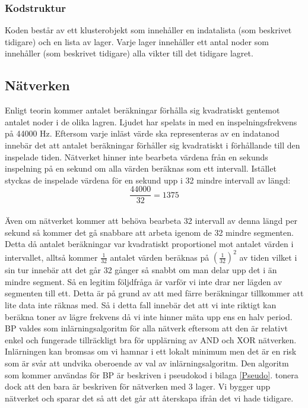 \documentclass[a4paper,10pt]{article}
\begin{document}
\subsubsection{Kodstruktur}
Koden består av ett klusterobjekt som innehåller en indatalista (som beskrivet tidigare) och en lista av lager. Varje lager innehåller ett antal noder som innehåller (som beskrivet tidigare) alla vikter till det tidigare lagret.

\subsection{Nätverken}
Enligt teorin kommer antalet beräkningar förhålla sig kvadratiskt gentemot antalet noder i de olika lagren. Ljudet har spelats in med en inspelningsfrekvens på 44000 Hz. Eftersom varje inläst värde ska representeras av en indatanod innebär det att antalet beräkningar förhåller sig kvadratiskt i förhållande till den inspelade tiden. Nätverket hinner inte bearbeta värdena från en sekunds inspelning på en sekund om alla värden beräknas som ett intervall. Istället styckas de inspelade värdena för en sekund upp i 32 mindre intervall av längd: \\
	\[\dfrac{44000}{32} = 1375\]  \\
Även om nätverket kommer att behöva bearbeta 32 intervall av denna längd per sekund så kommer det gå snabbare att arbeta igenom de 32 mindre segmenten. Detta då antalet beräkningar var kvadratiskt proportionel mot antalet värden i intervallet, alltså kommer $\frac{1}{32}$ antalet värden beräknas på $(\frac{1}{32})^2$ av tiden vilket i sin tur innebär att det går 32 gånger så snabbt om man delar upp det i än mindre segment. Så en legitim följdfråga är varför vi inte drar ner lägden av segmenten till ett. Detta är på grund av att med färre beräkningar tillkommer att lite data inte räknas med. Så i detta fall innebär det att vi inte riktigt kan beräkna toner av lägre frekvens då vi inte hinner mäta upp ens en halv period. 
BP valdes som inlärningsalgoritm för alla nätverk eftersom att den är relativt enkel och fungerade tillräckligt bra för upplärning av AND och XOR nätverken. Inlärningen kan bromsas om vi hamnar i ett lokalt minimum\autocite{NNDL} men det är en risk som är svår att undvika oberoende av val av inlärningsalgoritm.
Den algoritm som kommer användas för BP är beskriven i pseudokod i bilaga \ref{Pseudo}. tonera dock att den bara är beskriven för nätverken med 3 lager. Vi bygger upp nätverket och sparar det så att det går att återskapa ifrån det vi hade tidigare. 
\end{document}
